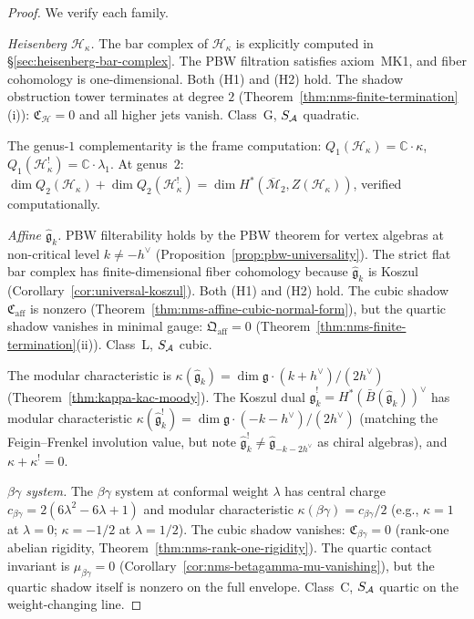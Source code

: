 \begin{proof}
We verify each family.

\emph{Heisenberg $\mathcal{H}_\kappa$.}
The bar complex of $\mathcal{H}_\kappa$ is explicitly
computed in \S\ref{sec:heisenberg-bar-complex}. The
PBW filtration satisfies axiom~MK1, and fiber
cohomology is one-dimensional. Both (H1) and (H2) hold.
The shadow obstruction tower terminates at degree $2$
(Theorem~\ref{thm:nms-finite-termination}(i)):
$\mathfrak{C}_{\mathcal{H}} = 0$ and all higher jets vanish.
Class~G, $S_{\mathcal{A}}$ quadratic.

The genus-$1$ complementarity is the frame computation:
$Q_1(\mathcal{H}_\kappa) = \mathbb{C} \cdot \kappa$,
$Q_1(\mathcal{H}_\kappa^!) = \mathbb{C} \cdot \lambda_1$.
At genus~$2$:
$\dim Q_2(\mathcal{H}_\kappa) + \dim Q_2(\mathcal{H}_\kappa^!)
= \dim H^*(\overline{\mathcal{M}}_2, Z(\mathcal{H}_\kappa))$,
verified computationally.

\emph{Affine $\widehat{\mathfrak{g}}_k$.}
PBW filterability holds by the PBW theorem for vertex algebras
at non-critical level $k \ne -h^{\vee}$
(Proposition~\ref{prop:pbw-universality}).
The strict flat bar complex has finite-dimensional fiber cohomology
because $\widehat{\mathfrak{g}}_k$ is Koszul
(Corollary~\ref{cor:universal-koszul}).
Both (H1) and (H2) hold.
The cubic shadow $\mathfrak{C}_{\mathrm{aff}}$ is nonzero
(Theorem~\ref{thm:nms-affine-cubic-normal-form}), but the
quartic shadow vanishes in minimal gauge:
$\mathfrak{Q}_{\mathrm{aff}} = 0$
(Theorem~\ref{thm:nms-finite-termination}(ii)).
Class~L, $S_{\mathcal{A}}$ cubic.

The modular characteristic is
$\kappa(\widehat{\mathfrak{g}}_k) = \dim\mathfrak{g}\cdot(k+h^{\vee})/(2h^{\vee})$
(Theorem~\ref{thm:kappa-kac-moody}).
The Koszul dual $\widehat{\mathfrak{g}}_k^! = H^*(\bar{B}(\widehat{\mathfrak{g}}_k))^\vee$ has modular characteristic
$\kappa(\widehat{\mathfrak{g}}_k^!)
= \dim\mathfrak{g}\cdot(-k - h^{\vee}) / (2h^{\vee})$
(matching the Feigin--Frenkel involution value, but note
$\widehat{\mathfrak{g}}_k^! \neq \widehat{\mathfrak{g}}_{-k-2h^{\vee}}$
as chiral algebras),
and $\kappa + \kappa^! = 0$.

\emph{$\beta\gamma$ system.}
The $\beta\gamma$ system at conformal weight $\lambda$ has central charge
$c_{\beta\gamma} = 2(6\lambda^2 - 6\lambda + 1)$ and
modular characteristic $\kappa(\beta\gamma) = c_{\beta\gamma}/2$
(e.g., $\kappa = 1$ at $\lambda = 0$; $\kappa = -1/2$ at $\lambda = 1/2$).
The cubic shadow vanishes: $\mathfrak{C}_{\beta\gamma} = 0$
(rank-one abelian rigidity,
Theorem~\ref{thm:nms-rank-one-rigidity}).
The quartic contact invariant is
$\mu_{\beta\gamma} = 0$
(Corollary~\ref{cor:nms-betagamma-mu-vanishing}), but the
quartic shadow itself is nonzero on the full envelope.
Class~C, $S_{\mathcal{A}}$ quartic on the weight-changing line.


\end{proof}
